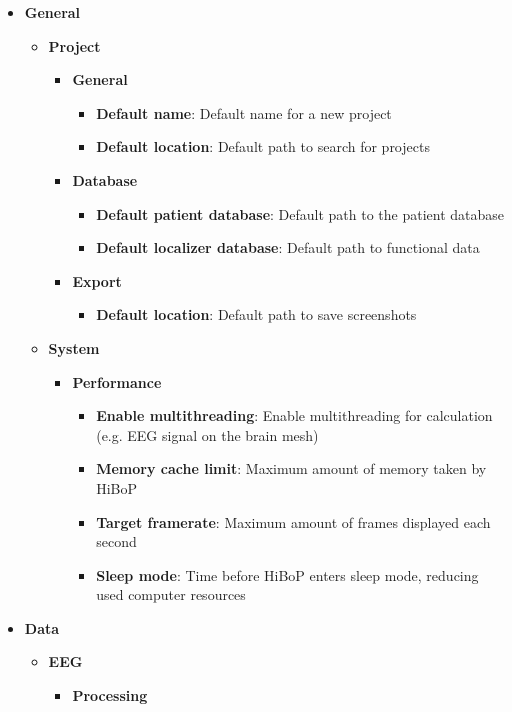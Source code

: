 \documentclass[a4paper]{article}
\begin{document}
\begin{itemize}
\item \textbf{General}
\begin{itemize}
\item \textbf{Project}
\begin{itemize}
\item \textbf{General}
\begin{itemize}
\item \textbf{Default name}: Default name for a new project
\item \textbf{Default location}: Default path to search for projects
\end{itemize}
\item \textbf{Database}
\begin{itemize}
\item \textbf{Default patient database}: Default path to the patient database
\item \textbf{Default localizer database}: Default path to functional data
\end{itemize}
\item \textbf{Export}
\begin{itemize}
\item \textbf{Default location}: Default path to save screenshots
\end{itemize}
\end{itemize}
\item \textbf{System}
\begin{itemize}
\item \textbf{Performance}
\begin{itemize}
\item \textbf{Enable multithreading}: Enable multithreading for calculation (e.g. EEG signal on the brain mesh)
\item \textbf{Memory cache limit}: Maximum amount of memory taken by HiBoP
\item \textbf{Target framerate}: Maximum amount of frames displayed each second
\item \textbf{Sleep mode}: Time before HiBoP enters sleep mode, reducing used computer resources
\end{itemize}
\end{itemize}
\end{itemize}
\item \textbf{Data}
\begin{itemize}
\item \textbf{EEG}
\begin{itemize}
\item \textbf{Processing}

\end{itemize}
\end{itemize}
\end{itemize}
\end{document}
